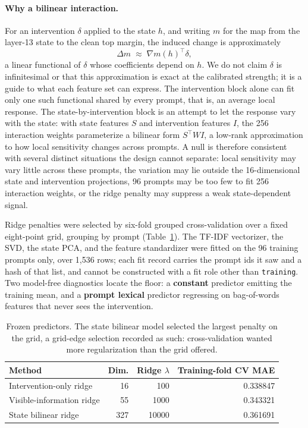\documentclass{article}
\begin{document}
\paragraph{Why a bilinear interaction.} For an intervention $\delta$ applied to the state $h$, and
writing $m$ for the map from the layer-13 state to the clean top margin, the induced change is
approximately
\begin{equation*}
  \Delta m \;\approx\; \nabla m(h)^{\top} \delta ,
\end{equation*}
a linear functional of $\delta$ whose coefficients depend on $h$. We do not claim $\delta$ is
infinitesimal or that this approximation is exact at the calibrated strength; it is a guide to what
each feature set can express. The intervention block alone can fit only one such functional shared
by every prompt, that is, an average local response. The state-by-intervention block is an attempt
to let the response vary with the state: with state features $S$ and intervention features $I$, the
256 interaction weights parameterize a bilinear form $S^{\top} W I$, a low-rank approximation to how
local sensitivity changes across prompts. A null is therefore consistent with several distinct
situations the design cannot separate: local sensitivity may vary little across these prompts, the
variation may lie outside the 16-dimensional state and intervention projections, 96 prompts may be
too few to fit 256 interaction weights, or the ridge penalty may suppress a weak state-dependent
signal.

Ridge penalties were selected by six-fold grouped cross-validation over a fixed eight-point grid,
grouping by prompt (Table~\ref{tab:predictors}). The TF-IDF vectorizer, the SVD, the state PCA, and
the feature standardizer were fitted on the 96 training prompts only, over 1{,}536 rows; each fit
record carries the prompt ids it saw and a hash of that list, and cannot be constructed with a fit
role other than \texttt{training}. Two model-free diagnostics locate the floor: a \textbf{constant}
predictor emitting the training mean, and a \textbf{prompt lexical} predictor regressing on
bag-of-words features that never sees the intervention.

\begin{table}[htbp]
\centering
\small
\begin{tabular}{lrrr}
\toprule
Method & Dim. & Ridge $\lambda$ & Training-fold CV MAE \\
\midrule
Intervention-only ridge   &  16 &   100 & 0.338847 \\
Visible-information ridge &  55 &  1000 & 0.343321 \\
State bilinear ridge      & 327 & 10000 & 0.361691 \\
\bottomrule
\end{tabular}
\caption{Frozen predictors. The state bilinear model selected the largest penalty on the grid, a
grid-edge selection recorded as such: cross-validation wanted more regularization than the grid
offered.}
\label{tab:predictors}
\end{table}
\end{document}
